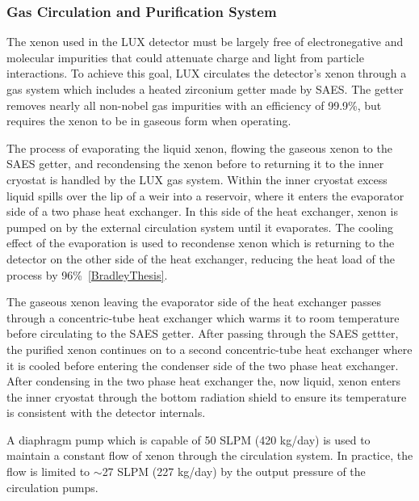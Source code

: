 \subsubsection{Gas Circulation and Purification System} \label{GasSystem}
The xenon used in the LUX detector must be largely free of electronegative and molecular impurities that could attenuate charge and light from particle interactions.  To achieve this goal, LUX circulates the detector’s xenon through a gas system which includes a heated zirconium getter made by SAES.  The getter removes nearly all non-nobel gas impurities with an efficiency of 99.9\%, but requires the xenon to be in gaseous form when operating.  

The process of evaporating the liquid xenon, flowing the gaseous xenon to the SAES getter, and recondensing the xenon before to returning it to the inner cryostat is handled by the LUX gas system. Within the inner cryostat excess liquid spills over the lip of a weir into a reservoir, where it enters the evaporator side of a two phase heat exchanger.  In this side of the heat exchanger, xenon is pumped on by the external circulation system until it evaporates. The cooling effect of the evaporation is used to recondense xenon which is returning to the detector on the other side of the heat exchanger, reducing the heat load of the process by 96\%~\ref{BradleyThesis}.


The gaseous xenon leaving the evaporator side of the heat exchanger passes through a concentric-tube heat exchanger which warms it to room temperature before circulating to the SAES getter.  After passing through the SAES gettter, the purified xenon continues on to a second concentric-tube heat exchanger where it is cooled before entering the condenser side of the two phase heat exchanger.  After condensing in the two phase heat exchanger the, now liquid, xenon enters the inner cryostat through the bottom radiation shield to ensure its temperature is consistent with the detector internals.

A diaphragm pump which is capable of 50 SLPM (420 kg/day) is used to maintain a constant flow of xenon through the circulation system.  In practice, the flow is limited to $\sim$27 SLPM (227 kg/day) by the output pressure of the circulation pumps. 

